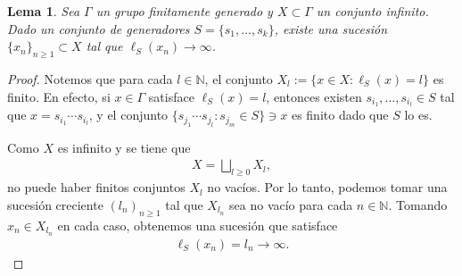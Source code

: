 \documentclass[11pt]{article}
\theoremstyle{colored}
\newtheorem{lemma}{Lema}
\newcommand{\N}{\mathbb{N}}
\begin{document}
\begin{lemma}{1} Sea $\Gamma$ un grupo finitamente generado y $X \subset \Gamma$ un conjunto infinito. Dado un conjunto de generadores $S = \{s_1, \dots, s_k\}$, existe una sucesión $\{x_n\}_{n \geq 1} \subset X$ tal que $\ell_S(x_n) \to \infty$.
\end{lemma}
\begin{proof} Notemos que para cada $l \in \N$, el conjunto $X_l := \{x \in X : \ell_S(x) = l\}$ es finito. En efecto, si $x \in \Gamma$ satisface $\ell_S(x) = l$, entonces existen $s_{i_1}, \dots, s_{i_l} \in S$ tal que $x = s_{i_1} \cdots s_{i_l}$, y el conjunto $\{s_{j_1} \cdots s_{j_l} : s_{j_m} \in S\} \ni x$ es finito dado que $S$ lo es. 

Como $X$ es infinito y se tiene que 
\begin{align*}
X = \bigsqcup_{l \geq 0}X_l,
\end{align*}
no puede haber finitos conjuntos $X_l$ no vacíos. Por lo tanto, podemos tomar una sucesión creciente $(l_n)_{n \geq 1}$ tal que $X_{l_n}$ sea no vacío para cada $n \in \N$. Tomando $x_n \in X_{l_n}$ en cada caso, obtenemos una sucesión que satisface
\begin{align*}
\ell_S(x_n) = l_n \to \infty.
\end{align*}
\end{proof}
\end{document}
